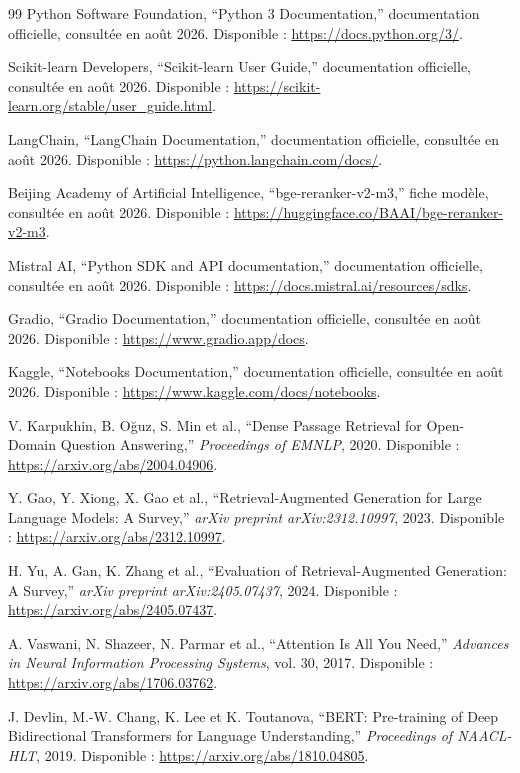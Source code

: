 \documentclass[12pt,a4paper,oneside]{report}
\begin{document}
\begin{thebibliography}{99}
Python Software Foundation, ``Python 3 Documentation,'' documentation officielle,
consultée en août 2026. Disponible : \url{https://docs.python.org/3/}.

Scikit-learn Developers, ``Scikit-learn User Guide,'' documentation officielle,
consultée en août 2026. Disponible : \url{https://scikit-learn.org/stable/user_guide.html}.

LangChain, ``LangChain Documentation,'' documentation officielle, consultée en
 août 2026. Disponible : \url{https://python.langchain.com/docs/}.

Beijing Academy of Artificial Intelligence, ``bge-reranker-v2-m3,'' fiche modèle,
consultée en août 2026. Disponible : \url{https://huggingface.co/BAAI/bge-reranker-v2-m3}.

Mistral AI, ``Python SDK and API documentation,'' documentation officielle,
consultée en août 2026. Disponible : \url{https://docs.mistral.ai/resources/sdks}.

Gradio, ``Gradio Documentation,'' documentation officielle, consultée en août
2026. Disponible : \url{https://www.gradio.app/docs}.

Kaggle, ``Notebooks Documentation,'' documentation officielle, consultée en août
2026. Disponible : \url{https://www.kaggle.com/docs/notebooks}.

V. Karpukhin, B. Oğuz, S. Min et al., ``Dense Passage Retrieval for Open-Domain
Question Answering,'' \textit{Proceedings of EMNLP}, 2020. Disponible :
\url{https://arxiv.org/abs/2004.04906}.

Y. Gao, Y. Xiong, X. Gao et al., ``Retrieval-Augmented Generation for Large
Language Models: A Survey,'' \textit{arXiv preprint arXiv:2312.10997}, 2023.
Disponible : \url{https://arxiv.org/abs/2312.10997}.

H. Yu, A. Gan, K. Zhang et al., ``Evaluation of Retrieval-Augmented Generation:
A Survey,'' \textit{arXiv preprint arXiv:2405.07437}, 2024. Disponible :
\url{https://arxiv.org/abs/2405.07437}.

A. Vaswani, N. Shazeer, N. Parmar et al., ``Attention Is All You Need,''
\textit{Advances in Neural Information Processing Systems}, vol. 30, 2017.
Disponible : \url{https://arxiv.org/abs/1706.03762}.

J. Devlin, M.-W. Chang, K. Lee et K. Toutanova, ``BERT: Pre-training of Deep
Bidirectional Transformers for Language Understanding,'' \textit{Proceedings of
NAACL-HLT}, 2019. Disponible : \url{https://arxiv.org/abs/1810.04805}.


\end{thebibliography}
\end{document}
